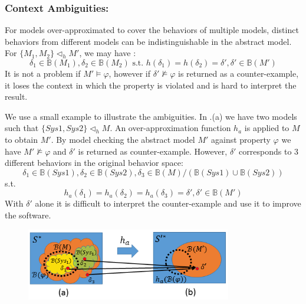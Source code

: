 \subsubsection{Context Ambiguities: }
For models over-approximated to cover the behaviors of multiple models, distinct behaviors from different models can be indistinguishable in the abstract model. For $\{M_1,M_2\}\triangleleft_h M'$, we may have :
$$ \delta_1\in\mathbb{B}(M_1),\delta_2\in \mathbb{B}(M_2)\text{ s.t. }h(\delta_1)=h(\delta_2)=\delta',\delta'\in \mathbb{B}(M')$$
It is not a problem if $M'\models\varphi$, however if $\delta'\not\models\varphi$ is returned as a counter-example, it loses the context in which the property is violated and is hard to interpret the result.

We use a small example to illustrate the ambiguities. In .(a) we have two models such that $\{Sys1,Sys2\}\triangleleft_h M$. An over-approximation function $h_a$ is applied to $M$ to obtain $M'$. By model checking the abstract model $M'$ against property $\varphi$ we have $M'\not\models\varphi$ and $\delta'$ is returned as counter-example. However, $\delta'$ corresponds to 3 different behaviors in the original behavior space:
$$ \delta_1\in\mathbb{B}(Sys1),\delta_2\in \mathbb{B}(Sys2), \delta_3\in\mathbb{B}(M)/(\mathbb{B}(Sys1)\cup\mathbb{B}(Sys2))$$
s.t. 
$$h_a(\delta_1)=h_a(\delta_2)=h_a(\delta_3)=\delta',\delta'\in \mathbb{B}(M')$$
With $\delta'$ alone it is difficult to interpret the counter-example and use it to improve the software.

\begin{figure}[!t]
		\centering
		\includegraphics[width=0.8\textwidth]{figs/distinction.png}
		\caption{\small }
		\label{fig:ambiguity}
\end{figure}

